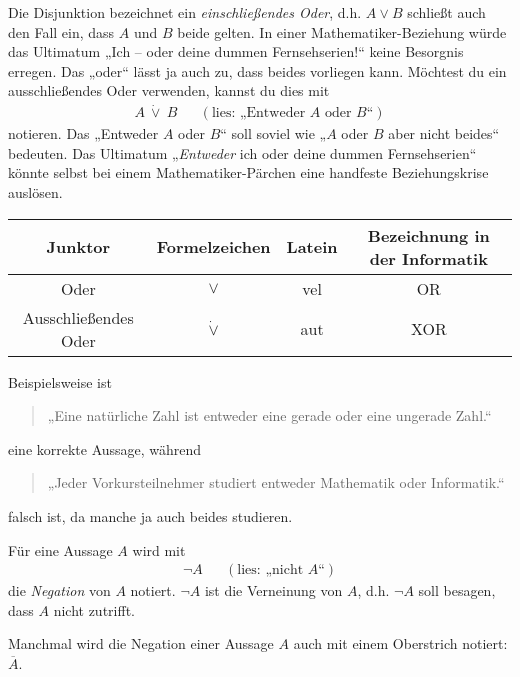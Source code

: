 	
\begin{bem} \label{entwederoder}
    Die Disjunktion bezeichnet ein \emph{einschließendes Oder}, d.h. $A\lor B$ schließt auch den Fall ein, dass $A$ und $B$ beide gelten. In einer Mathematiker-Beziehung würde das Ultimatum „Ich -- oder deine dummen Fernsehserien!“ keine Besorgnis erregen. Das „oder“ lässt ja auch zu, dass beides vorliegen kann. Möchtest du ein ausschließendes Oder verwenden, kannst du dies mit
    \begin{align*}
        A\ \dot\lor\ B && (\text{lies: „Entweder $A$ oder $B$“})
    \end{align*}
    notieren. Das „Entweder $A$ oder $B$“ soll soviel wie „$A$ oder $B$ aber nicht beides“ bedeuten. Das Ultimatum „\emph{Entweder} ich oder deine dummen Fernsehserien“ könnte selbst bei einem Mathematiker-Pärchen eine handfeste Beziehungskrise auslösen.
    \begin{center}
    \begin{tabular}{cccc}
        Junktor &  Formelzeichen & Latein & Bezeichnung in der Informatik \\
        \midrule
        Oder &  $\lor$ & vel & OR \\
        Ausschließendes Oder & $\dot\lor$ & aut & XOR
    \end{tabular}
    \end{center}
\end{bem}


\begin{bsp}[*]
    Beispielsweise ist
    \begin{quote}
        „Eine natürliche Zahl ist entweder eine gerade oder eine ungerade Zahl.“
    \end{quote}
    eine korrekte Aussage, während
    \begin{quote}
        „Jeder Vorkursteilnehmer studiert entweder Mathematik oder Informatik.“
    \end{quote}
    falsch ist, da manche ja auch beides studieren.
\end{bsp}


\begin{defin}[Negation] 
    Für eine Aussage $A$ wird mit
    \begin{align*}
        \neg A   && (\text{lies: „nicht $A$“})
    \end{align*}
    die \emph{Negation} von $A$ notiert. $\neg A$ ist die Verneinung von $A$, d.h. $\neg A$ soll besagen, dass $A$ nicht zutrifft.
    
    Manchmal wird die Negation einer Aussage $A$ auch mit einem Oberstrich notiert: $\overline{A}$.
\end{defin}


